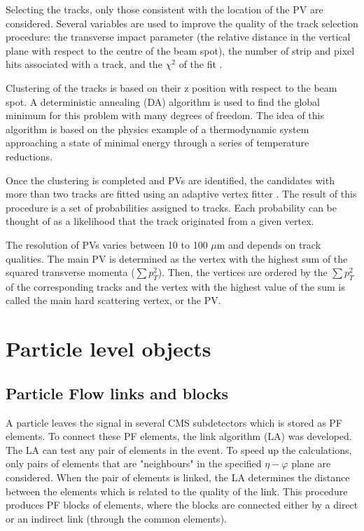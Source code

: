 \begin{small}
Selecting the tracks, only those consistent with the location of the PV are considered. Several variables are used to improve the quality of the track selection procedure: the transverse impact parameter (the relative distance in the vertical plane with respect to the centre of the beam spot),  the number of strip and pixel hits associated with a track, and the $\chi^2$ of the fit .

Clustering of the tracks is based on their z position with respect to the beam spot. A deterministic annealing (DA) algorithm \cite{DeterministicAnnealing} is used to find the global minimum for this problem with many degrees of freedom. The idea of this algorithm is based on the physics example of a thermodynamic system approaching a state of minimal energy through a series of temperature reductions. 

Once the clustering is completed and PVs are identified, the candidates with more than two tracks are fitted using an adaptive vertex fitter \cite{AdaptiveVertexFitting}. The result of this procedure is a set of probabilities assigned to tracks. Each probability can be thought of as a likelihood that the track originated from a given vertex.

The resolution of PVs varies between 10 to 100 $\mu$m and depends on track qualities. The main PV is determined as the vertex with the highest sum of the squared transverse momenta ($\sum p_T^2$). Then, the vertices are ordered by the $\sum p_T^2$ of the corresponding tracks and the vertex with the highest value of the sum is called the main hard scattering vertex, or the PV. 

\section{Particle level objects}\label{sec:muons}
\subsection{Particle Flow links and blocks}\label{sec:some_reconstruction}

A particle leaves the signal in several CMS subdetectors which is stored as PF \cite{ParticleFlow} elements. To connect these PF elements, the link algorithm (LA) was developed. The LA can test any pair of elements in the event. To speed up the calculations, only pairs of elements that are "neighbours" in the specified $\eta - \varphi$ plane are considered. When the pair of elements is linked, the LA determines the distance between the elements which is related to the quality of the link. This procedure produces PF blocks of elements, where the blocks are connected either by a direct or an indirect link (through the common elements).


\end{small}
